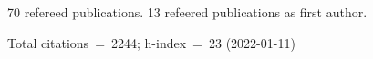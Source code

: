70 refereed publications. 13 refeered publications as first author.

Total citations~=~2244; h-index~=~23 (2022-01-11)